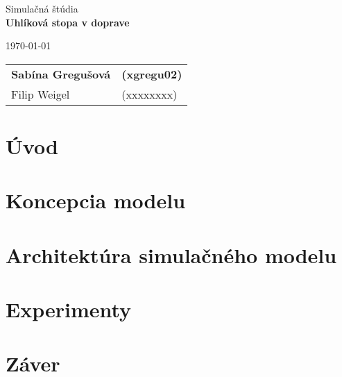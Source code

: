 \documentclass[a4paper, 11pt]{article}
\begin{document}
	\begin{titlepage}
		\begin{center}


			\Huge{Simulačná štúdia} \\
			\LARGE{\textbf{Uhlíková stopa v doprave}} \\

		\end{center}

		\begin{minipage}{0.5 \textwidth}
			\Large
			\today
		\end{minipage}
		\hfill
		\begin{minipage}[r]{0.5 \textwidth}
			\Large
			\begin{tabular}{ll}
				\textbf{Sabína Gregušová} & \textbf{(xgregu02)} \\
				Filip Weigel & (xxxxxxxx)
			\end{tabular}
		\end{minipage}
	\end{titlepage}

	\clearpage
	\tableofcontents


	\clearpage
	\setcounter{page}{1}

	\section{Úvod}
	\section{Koncepcia modelu}
	\section{Architektúra simulačného modelu}
	\section{Experimenty}
	\section{Záver}
\end{document}
